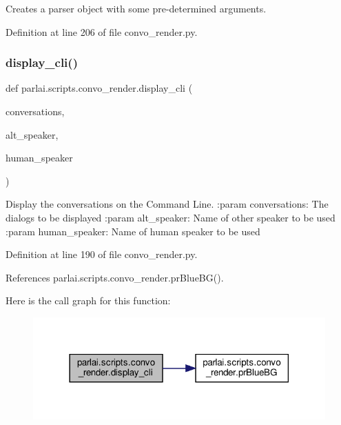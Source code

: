 \begin{DoxyVerb}Creates a parser object with some pre-determined arguments.\end{DoxyVerb}
 

Definition at line 206 of file convo\+\_\+render.\+py.

\mbox{\label{namespaceparlai_1_1scripts_1_1convo__render_a68e7e186a59ac2397560d0107f804ff3}} 
\subsubsection{\texorpdfstring{display\+\_\+cli()}{display\_cli()}}
{\footnotesize\ttfamily def parlai.\+scripts.\+convo\+\_\+render.\+display\+\_\+cli (\begin{DoxyParamCaption}\item[{}]{conversations,  }\item[{}]{alt\+\_\+speaker,  }\item[{}]{human\+\_\+speaker }\end{DoxyParamCaption})}

\begin{DoxyVerb}Display the conversations on the Command Line.
:param conversations: The dialogs to be displayed
:param alt_speaker: Name of other speaker to be used
:param human_speaker: Name of human speaker to be used
\end{DoxyVerb}
 

Definition at line 190 of file convo\+\_\+render.\+py.



References parlai.\+scripts.\+convo\+\_\+render.\+pr\+Blue\+B\+G().

Here is the call graph for this function\+:
\nopagebreak
\begin{figure}[H]
\begin{center}
\leavevmode
\includegraphics[width=318pt]{namespaceparlai_1_1scripts_1_1convo__render_a68e7e186a59ac2397560d0107f804ff3_cgraph}
\end{center}
\end{figure}
\mbox{\label{namespaceparlai_1_1scripts_1_1convo__render_a8c393321c36d1cafceb86aa3f7431c4c}} 
